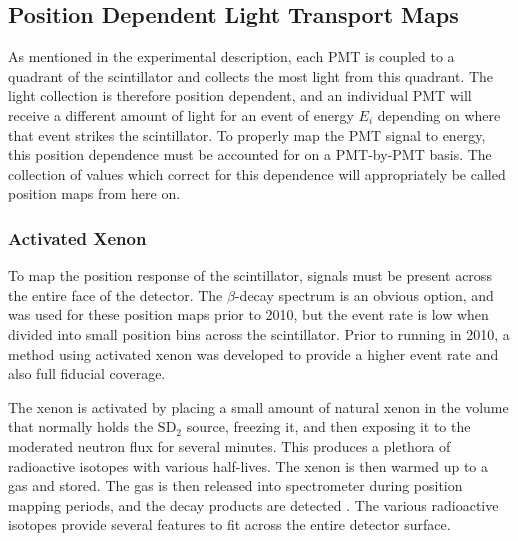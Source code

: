 

\subsection{Position Dependent Light Transport Maps} \label{ssec:posmaps}

As mentioned in the experimental description, each PMT is coupled to a quadrant of
the scintillator and collects the most light from this quadrant. The light collection
is therefore position dependent, and an individual PMT will receive a different
amount of light for an event of energy $E_i$ depending on where that event strikes
the scintillator. To properly map the PMT signal to energy, this position dependence
must be accounted for on a PMT-by-PMT basis. The collection of values which correct for this
dependence will appropriately be called position maps from here on.


\subsubsection{Activated Xenon}

To map the position response of the scintillator, signals must be present across the
entire face of the detector. The $\beta$-decay spectrum
is an obvious option, and was used for these position maps prior to 2010,
but the event rate is low when divided into small position bins across the scintillator.
Prior to running in 2010, a method using activated xenon was developed to provide
a higher event rate and also full fiducial coverage.

The xenon is activated by placing a small amount of natural xenon in the volume that
normally holds the $\mathrm{SD}_2$ source, freezing it, and then exposing it to the moderated
neutron flux for several minutes. This produces a plethora of radioactive isotopes
with various half-lives. The xenon is then warmed up to a gas and stored. The gas
is then released into spectrometer during position mapping periods, and the decay products
are detected \cite{mpmThesis}. The various radioactive isotopes provide several features to fit across the entire
detector surface.

